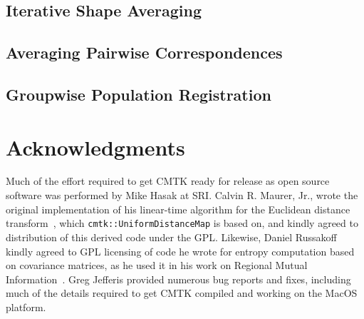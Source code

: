 \documentclass{InsightArticle}
\begin{document}
\subsection{Iterative Shape Averaging}

\cite{RohlBranMaur:2001}
\cite{KuryRohlKrof:2008,BranRohlRyba:2005}

\subsection{Averaging Pairwise Correspondences}

\cite{GuimMeunThir:2000}

\subsection{Groupwise Population Registration}

\cite{Learned-Miller:2006}
\cite{BalcGollShen:2007}
\cite{RohlZahrSull:2008,RohlZahrSull:2010}

\section*{Acknowledgments}

Much of the effort required to get CMTK ready for release as open source
software was performed by Mike Hasak at SRI. Calvin R. Maurer, Jr., wrote the
original implementation of his linear-time algorithm for the Euclidean
distance transform~\cite{MaurQiRagh:2003}, which
\verb|cmtk::UniformDistanceMap| is based on, and kindly agreed to distribution
of this derived code under the GPL. Likewise, Daniel Russakoff kindly agreed
to GPL licensing of code he wrote for entropy computation based on covariance
matrices, as he used it in his work on Regional Mutual
Information~\cite{RussTomaRohl:2004}. Greg Jefferis provided numerous bug
reports and fixes, including much of the details required to get CMTK compiled
and working on the MacOS platform.

%
%



\end{document}
